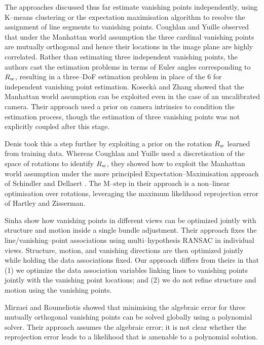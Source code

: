 The approaches discussed thus far estimate vanishing points
independently, using K--means clustering or the expectation
maximisation algorithm to resolve the assignment of line segments to
vanishing points. Coughlan and Yuille \cite{Coughlan99} observed that
under the Manhattan world assumption the three cardinal vanishing
points are mutually orthogonal and hence their locations in the image
plane are highly correlated. Rather than estimating three independent
vanishing points, the authors cast the estimation problems in terms of
Euler angles corresponding to $\SceneR$, resulting in a three--DoF
estimation problem in place of the 6 for independent vanishing point
estimation. Koseck\`{a} and Zhang \cite{Zhang02} showed that the
Manhattan world assumption can be exploited even in the case of an
uncalibrated camera. Their approach used a prior on camera intrinsics
to condition the estimation process, though the estimation of three
vanishing points was not explicitly coupled after this stage.

Denis \etal \cite{denis2008efficient} took this a step further by
exploiting a prior on the rotation $\SceneR$ learned from training
data. Whereas Coughlan and Yuille used a discretisation of the space
of rotations to identify $\SceneR$, they showed how to exploit the
Manhattan world assumption under the more principled
Expectation--Maximisation approach of Schindler and Dellaert
\cite{Schindler2004}. The M--step in their approach is a non--linear
optimisation over rotations, leveraging the maximum likelihood
reprojection error of Hartley and Zisserman\cite{Hartley04}.

Sinha \etal \cite{Sinha2008} show how vanishing points in different
views can be optimized jointly with structure and motion inside a
single bundle adjustment. Their approach fixes the
line/vanishing--point associations using multi--hypothesis RANSAC in
individual views. Structure, motion, and vanishing directions are then
optimized jointly while holding the data associations fixed. Our approach
differs from theirs in that (1) we optimize the data association
variables linking lines to vanishing points jointly with the vanishing
point locations; and (2) we do not refine structure and motion using
the vanishing points\changedsinceviva.

Mirzaei and Roumeliotis \cite{Mirzaei2011} showed that
minimising the algebraic error for three mutually orthogonal vanishing
points can be solved globally using a polynomial solver. Their
approach assumes the algebraic error; it is not clear whether the
reprojection error leads to a likelihood that is amenable to a
polynomial solution.

